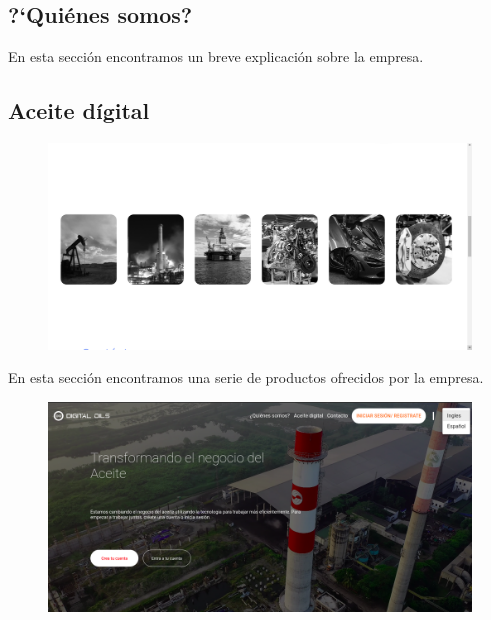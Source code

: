 \subsection*{?`Qui\'enes somos?}


En esta secci\'on encontramos un breve explicaci\'on sobre la empresa.

\subsection*{Aceite d\'igital}

\begin{figure}[h!]
	\centering
	\includegraphics[width=1\linewidth, height=0.4\textheight]{imagenes/inicioThree}
	\caption[Tercera  parte del inicio.]{}
	\label{fig:inicioThree}
\end{figure}
En esta secci\'on encontramos una serie de productos ofrecidos por la empresa.

\begin{figure}[!]
	\centering
	\includegraphics[width=1\linewidth, height=0.4\textheight]{imagenes/inicioOneIdioma}
	\caption[\'Area principal.]{}
	\label{fig:iniciooneidioma}
\end{figure}



